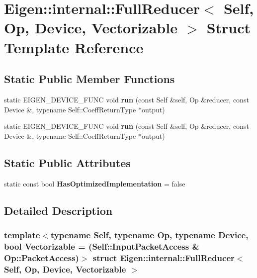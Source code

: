 \hypertarget{struct_eigen_1_1internal_1_1_full_reducer}{}\section{Eigen\+:\+:internal\+:\+:Full\+Reducer$<$ Self, Op, Device, Vectorizable $>$ Struct Template Reference}
\label{struct_eigen_1_1internal_1_1_full_reducer}
\subsection*{Static Public Member Functions}
\begin{DoxyCompactItemize}
\item 
\mbox{\label{struct_eigen_1_1internal_1_1_full_reducer_a506159dc2c13ca4882575512f42f972f}} 
static E\+I\+G\+E\+N\+\_\+\+D\+E\+V\+I\+C\+E\+\_\+\+F\+U\+NC void {\bfseries run} (const Self \&self, Op \&reducer, const Device \&, typename Self\+::\+Coeff\+Return\+Type $\ast$output)
\item 
\mbox{\label{struct_eigen_1_1internal_1_1_full_reducer_a506159dc2c13ca4882575512f42f972f}} 
static E\+I\+G\+E\+N\+\_\+\+D\+E\+V\+I\+C\+E\+\_\+\+F\+U\+NC void {\bfseries run} (const Self \&self, Op \&reducer, const Device \&, typename Self\+::\+Coeff\+Return\+Type $\ast$output)
\end{DoxyCompactItemize}
\subsection*{Static Public Attributes}
\begin{DoxyCompactItemize}
\item 
\mbox{\label{struct_eigen_1_1internal_1_1_full_reducer_ac925d371501ab67eb5761e27e89fd4a1}} 
static const bool {\bfseries Has\+Optimized\+Implementation} = false
\end{DoxyCompactItemize}


\subsection{Detailed Description}
\subsubsection*{template$<$typename Self, typename Op, typename Device, bool Vectorizable = (\+Self\+::\+Input\+Packet\+Access \& Op\+::\+Packet\+Access)$>$\newline
struct Eigen\+::internal\+::\+Full\+Reducer$<$ Self, Op, Device, Vectorizable $>$}



